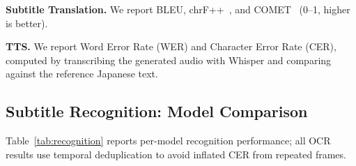 \documentclass[mathematics,article,submit,xetex,moreauthors]{Definitions/mdpi}
\begin{document}
\textbf{Subtitle Translation.} We report BLEU, chrF++~\cite{popovic2015chrf}, and COMET~\cite{rei2020comet} (0--1, higher is better).

\textbf{TTS.} We report Word Error Rate (WER) and Character Error Rate (CER), computed by transcribing the generated audio with Whisper and comparing against the reference Japanese text.

\subsection{Subtitle Recognition: Model Comparison}
\label{sec:ocr_comparison}
Table~\ref{tab:recognition} reports per-model recognition performance; all OCR results use temporal deduplication to avoid inflated CER from repeated frames.

\begin{table}[H]
\centering
\caption{Subtitle recognition performance. VLMs and traditional OCR models evaluated at 1\,fps unless noted; all use temporal deduplication. Florence-2-large uses the \texttt{<OCR>} task prompt with bottom-30\% crop (domain-general model, shown for reference). Whisper (ASR) listed separately. Best OCR/VLM results in bold.}
\label{tab:recognition}
\end{table}
\end{document}
